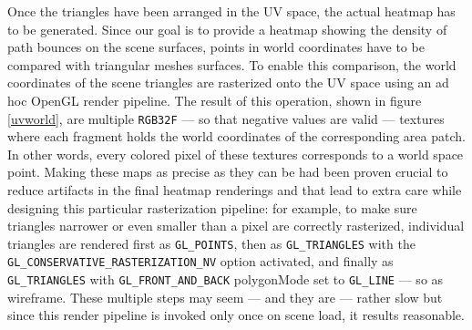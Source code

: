 Once the triangles have been arranged in the UV space, the actual heatmap has to be generated. Since our goal is to provide a heatmap showing the density of path bounces on the scene surfaces, points in world coordinates have to be compared with triangular meshes surfaces. To enable this comparison, the world coordinates of the scene triangles are rasterized onto the UV space using an ad hoc OpenGL render pipeline. The result of this operation, shown in figure \ref{uvworld}, are multiple \texttt{RGB32F} --- so that negative values are valid --- textures where each fragment holds the world coordinates of the corresponding area patch. In other words, every colored pixel of these textures corresponds to a world space point. Making these maps as precise as they can be had been proven crucial to reduce artifacts in the final heatmap renderings and that lead to extra care while designing this particular rasterization pipeline: for example, to make sure triangles narrower or even smaller than a pixel are correctly rasterized, individual triangles are rendered first as \texttt{GL\_POINTS}, then as \texttt{GL\_TRIANGLES} with the \texttt{GL\_CONSERVATIVE\_RASTERIZATION\_NV} option activated, and finally as \texttt{GL\_TRIANGLES} with \texttt{GL\_FRONT\_AND\_BACK} polygonMode set to \texttt{GL\_LINE} --- so as wireframe. These multiple steps may seem --- and they are --- rather slow but since this render pipeline is invoked only once on scene load, it results reasonable.


